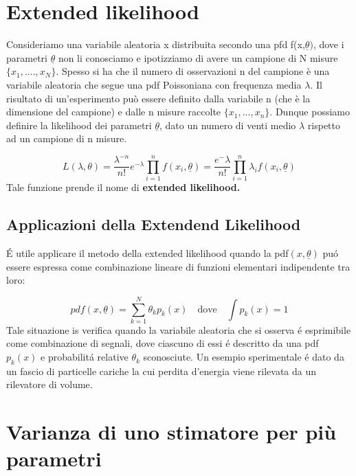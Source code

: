 \section{Extended likelihood}

Consideriamo una variabile aleatoria x distribuita secondo una pfd f(x,$\underline{\theta})$, dove i parametri $\underline{\theta}$ non li conosciamo e ipotizziamo di avere un campione di N misure $\{x_1,....,x_N\}$. Spesso si ha che il numero di osservazioni n del campione \`{e} una variabile aleatoria che segue una pdf Poissoniana con frequenza media $\lambda$. Il risultato di un'esperimento pu\`{o} essere definito dalla variabile n (che \`{e} la dimensione del campione) e dalle n misure raccolte $\{x_1,...,x_n\}.$ \newline
Dunque possiamo definire la likelihood dei parametri $\underline{\theta}$, dato un numero di venti medio $\lambda$ rispetto ad un campione di n misure.

\begin{equation}
	L(\lambda,\theta) = \dfrac{\lambda^{-n}}{n!}e^{-\lambda} \prod_{i=1}^nf(x_i,\underline{\theta}) = \dfrac{e^-{\lambda}}{n!} \prod_{i=1}^{n} \lambda_{i}f(x_i,\underline{\theta})
\end{equation}
Tale funzione prende il nome di \textbf{extended likelihood.}

\subsection{Applicazioni della Extendend Likelihood}
\'{E} utile applicare il metodo della extended likelihood quando la pdf$(x,\underline{\theta})$ pu\'{o} essere espressa come combinazione lineare di funzioni elementari indipendente tra loro:

\begin{equation*}
	pdf(x, \underline{\theta}) = \sum_{k=1}^N\theta_kp_k(x) \quad \text{dove} \quad \int p_k(x) = 1
\end{equation*}
Tale situazione is verifica quando la variabile aleatoria che si osserva \'{e} esprimibile come combinazione di segnali, dove ciascuno di essi \'{e} descritto da una pdf $p_k(x)$ e probabilit\'{a} relative $\theta_k$ sconosciute. \newline
Un esempio sperimentale \'{e} dato da un fascio di particelle cariche la cui perdita d'energia viene rilevata da un rilevatore di volume. 
\section{Varianza di uno stimatore per pi\`{u} parametri}

